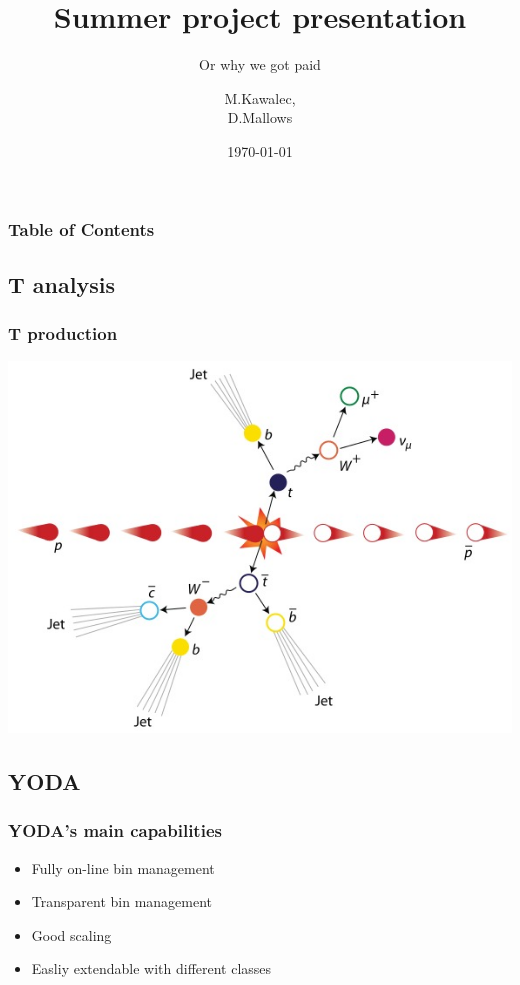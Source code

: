 \documentclass{beamer}
\title{Summer project presentation}
\subtitle{Or why we got paid}
\author{M.Kawalec, \\ D.Mallows}
\date{\today}
\begin{document}
  \frame{\titlepage}

  \begin{frame}
    \frametitle{Table of Contents}
    \tableofcontents
  \end{frame}

  \begin{frame}
    \section{T analysis}
    \frametitle{T production}
    \includegraphics[height=0.89\textheight]{ttbar.jpg}
  \end{frame}
  \begin{frame}
    \section{YODA}
    \frametitle{YODA's main capabilities} 
    \begin{block}
      \begin{itemize}
        \item Fully on-line bin management \pause
        \item Transparent bin management \pause
        \item Good scaling \pause
        \item Easliy extendable with different classes
      \end{itemize}
    \end{block}
  \end{frame}
\end{document}

